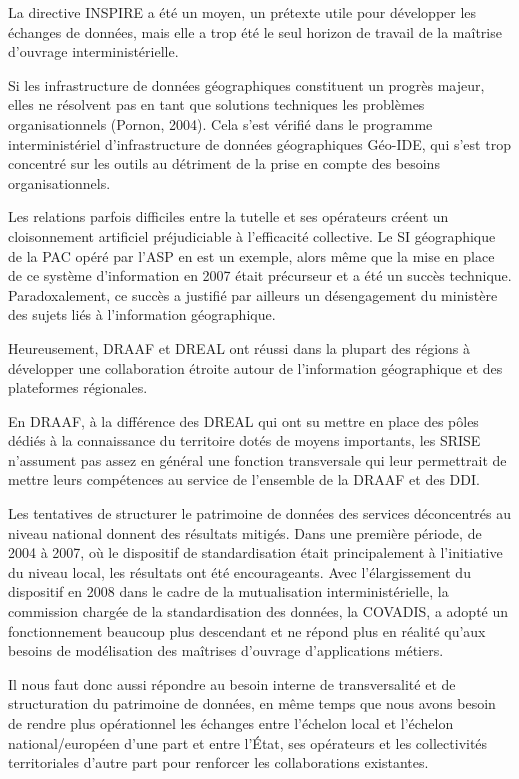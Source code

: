 \stopitemize

La directive INSPIRE a été un moyen, un prétexte utile pour développer les
échanges de données, mais elle a trop été le seul horizon de travail de la
maîtrise d'ouvrage interministérielle.

Si les infrastructure de données géographiques constituent un progrès majeur,
elles ne résolvent pas en tant que solutions techniques les problèmes
organisationnels (Pornon, 2004). Cela s'est vérifié dans le programme
interministériel d'infrastructure de données géographiques Géo-IDE, qui s'est
trop concentré sur les outils au détriment de la prise en compte des besoins
organisationnels.

Les relations parfois difficiles entre la tutelle et ses opérateurs créent un
cloisonnement artificiel préjudiciable à l'efficacité collective. Le SI
géographique de la PAC opéré par l'ASP en est un exemple, alors même que la
mise en place de ce système d'information en 2007 était précurseur et a été un
succès technique. Paradoxalement, ce succès a justifié par ailleurs un
désengagement du ministère des sujets liés à l'information géographique.

Heureusement, DRAAF et DREAL ont réussi dans la plupart des régions à
développer une collaboration étroite autour de l'information géographique et
des plateformes régionales.

En DRAAF, à la différence des DREAL qui ont su mettre en place des pôles
dédiés à la connaissance du territoire dotés de moyens importants, les SRISE
n'assument pas assez en général une fonction transversale qui leur permettrait
de mettre leurs compétences au service de l'ensemble de la DRAAF et des DDI.

Les tentatives de structurer le patrimoine de données des services
déconcentrés au niveau national donnent des résultats mitigés. Dans une
première période, de 2004 à 2007, où le dispositif de standardisation était
principalement à l'initiative du niveau local, les résultats ont été
encourageants. Avec l'élargissement du dispositif en 2008 dans le cadre de la
mutualisation interministérielle, la commission chargée de la standardisation
des données, la COVADIS, a adopté un fonctionnement beaucoup plus descendant
et ne répond plus en réalité qu'aux besoins de modélisation des maîtrises
d'ouvrage d'applications métiers.

Il nous faut donc aussi répondre au besoin interne de transversalité et de
structuration du patrimoine de données, en même temps que nous avons besoin de
rendre plus opérationnel les échanges entre l'échelon local et l'échelon
national/européen d'une part et entre l'État, ses opérateurs et les
collectivités territoriales d'autre part pour renforcer les collaborations
existantes.

